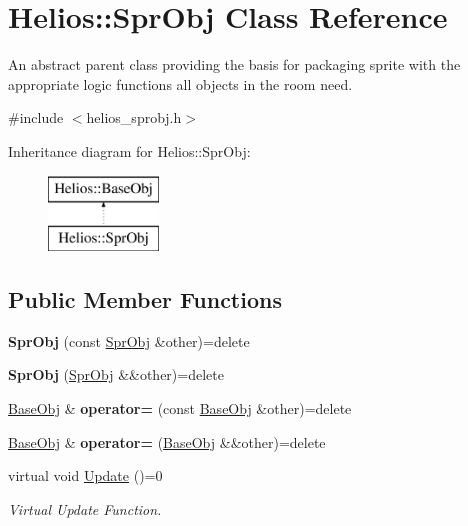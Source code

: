 \hypertarget{class_helios_1_1_spr_obj}{}\section{Helios\+:\+:Spr\+Obj Class Reference}
\label{class_helios_1_1_spr_obj}


An abstract parent class providing the basis for packaging sprite with the appropriate logic functions all objects in the room need.  




{\ttfamily \#include $<$helios\+\_\+sprobj.\+h$>$}

Inheritance diagram for Helios\+:\+:Spr\+Obj\+:\begin{figure}[H]
\begin{center}
\leavevmode
\includegraphics[height=2.000000cm]{class_helios_1_1_spr_obj}
\end{center}
\end{figure}
\subsection*{Public Member Functions}
\begin{DoxyCompactItemize}
\item 
\hypertarget{class_helios_1_1_spr_obj_ab803d71e66b25686f4d6a29c1f3ee0d6}{}{\bfseries Spr\+Obj} (const \hyperlink{class_helios_1_1_spr_obj}{Spr\+Obj} \&other)=delete\label{class_helios_1_1_spr_obj_ab803d71e66b25686f4d6a29c1f3ee0d6}

\item 
\hypertarget{class_helios_1_1_spr_obj_ab0a6136a689b13a5ab16270df52a303a}{}{\bfseries Spr\+Obj} (\hyperlink{class_helios_1_1_spr_obj}{Spr\+Obj} \&\&other)=delete\label{class_helios_1_1_spr_obj_ab0a6136a689b13a5ab16270df52a303a}

\item 
\hypertarget{class_helios_1_1_spr_obj_a89e23d41b2a2b4262ed68b9c81cdbe42}{}\hyperlink{class_helios_1_1_base_obj}{Base\+Obj} \& {\bfseries operator=} (const \hyperlink{class_helios_1_1_base_obj}{Base\+Obj} \&other)=delete\label{class_helios_1_1_spr_obj_a89e23d41b2a2b4262ed68b9c81cdbe42}

\item 
\hypertarget{class_helios_1_1_spr_obj_a99d676eda512fa5dbc026ca6db1bfcb0}{}\hyperlink{class_helios_1_1_base_obj}{Base\+Obj} \& {\bfseries operator=} (\hyperlink{class_helios_1_1_base_obj}{Base\+Obj} \&\&other)=delete\label{class_helios_1_1_spr_obj_a99d676eda512fa5dbc026ca6db1bfcb0}

\item 
virtual void \hyperlink{class_helios_1_1_spr_obj_a5ea59f62cf7bb7bd7ff8080a79894037}{Update} ()=0
\begin{DoxyCompactList}\small\item\em Virtual Update Function. \end{DoxyCompactList}\end{DoxyCompactItemize}
